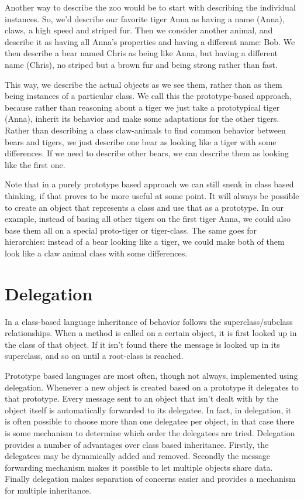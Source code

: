 \documentclass[a4paper,12pt]{book}
\begin{document}
Another way to describe the zoo would be to start with describing the individual instances. So, we'd describe our favorite tiger Anna as having a name (Anna), claws, a high speed and striped fur. Then we consider another animal, and describe it as having all Anna's properties and having a different name: Bob. We then describe a bear named Chris as being like Anna, but having a different name (Chris), no striped but a brown fur and being strong rather than fast.

This way, we describe the actual objects as we see them, rather than as them being instances of a particular class. We call this the prototype-based approach, because rather than reasoning about a  tiger we just take a prototypical tiger (Anna), inherit its behavior and make some adaptations for the other tigers. Rather than describing a class claw-animals to find common behavior between bears and tigers, we just describe one bear as looking like a tiger with some differences. If we need to describe other bears, we can describe them as looking like the first one.

Note that in a purely prototype based approach we can still sneak in class based thinking, if that proves to be more useful at some point. It will always be possible to create an object that represents a class and use that as a prototype. In our example, instead of basing all other tigers on the first tiger Anna, we could also base them all on a special proto-tiger or tiger-class. The same goes for hierarchies: instead of a bear looking like a tiger, we could make both of them look like a claw animal class with some differences.

\section*{Delegation}
In a class-based language inheritance of behavior follows the superclass/subclass relationships. When a method is called on a certain object, it is first looked up in the class of that object. If it isn't found there the message is looked up in its superclass, and so on until a root-class is reached.

Prototype based languages are most often, though not always, implemented using delegation. Whenever a new object is created based on a prototype it delegates to that prototype. Every message sent to an object that isn't dealt with by the object itself is automatically forwarded to its delegatee. In fact, in delegation, it is often possible to choose more than one delegatee per object, in that case there is some mechanism to determine which order the delegatees are tried. Delegation provides a number of advantages over class based inheritance. Firstly, the delegatees may be dynamically added and removed. Secondly the message forwarding mechanism makes it possible to let multiple objects share data. Finally delegation makes separation of concerns easier and provides a mechanism for multiple inheritance.
\end{document}
